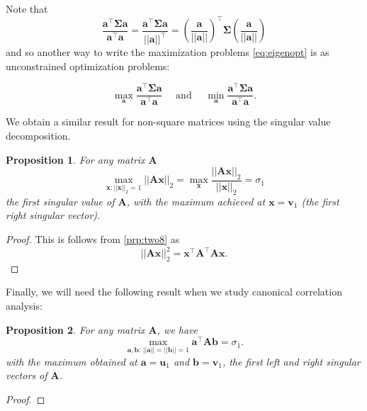 \documentclass[]{book}
\newtheorem{proposition}{Proposition}[chapter]
\theoremstyle{definition}
\theoremstyle{definition}
\theoremstyle{definition}
\theoremstyle{remark}
\begin{document}
Note that \[\frac{\boldsymbol a^\top \boldsymbol \Sigma\boldsymbol a}{\boldsymbol a^\top\boldsymbol a}=\frac{\boldsymbol a^\top \boldsymbol \Sigma\boldsymbol a}{||\boldsymbol a||^\top} = (\frac{\boldsymbol a}{||\boldsymbol a||})^\top \boldsymbol \Sigma(\frac{\boldsymbol a}{||\boldsymbol a||})\]
and so another way to write the maximization problems \eqref{eq:eigenopt} is as unconstrained optimization problems:

\[\max_{\boldsymbol a}\frac{\boldsymbol a^\top \boldsymbol \Sigma\boldsymbol a}{\boldsymbol a^\top\boldsymbol a}\quad \mbox{ and } \quad \min_{\boldsymbol a}\frac{\boldsymbol a^\top \boldsymbol \Sigma\boldsymbol a}{\boldsymbol a^\top\boldsymbol a}.\]

We obtain a similar result for non-square matrices using the singular value decomposition.

\begin{proposition}
\protect\hypertarget{prp:svdmax1}{}{\label{prp:svdmax1} }For any matrix \(\boldsymbol A\)
\[\max_{\boldsymbol x: ||\boldsymbol x||_2=1}||\boldsymbol A\boldsymbol x||_2=\max_{\boldsymbol x}\frac{||\boldsymbol A\boldsymbol x||_2}{||\boldsymbol x||_2}=\sigma_1\]
the first singular value of \(\boldsymbol A\), with the maximum achieved at \(\boldsymbol x=\boldsymbol v_1\) (the first right singular vector).
\end{proposition}
\begin{proof}
{}This is follows from \ref{prp:two8} as
\[||\boldsymbol A\boldsymbol x||_2^2=\boldsymbol x^\top \boldsymbol A^\top\boldsymbol A\boldsymbol x.\]
\end{proof}

Finally, we will need the following result when we study canonical correlation analysis:

\begin{proposition}
\protect\hypertarget{prp:svdmax2}{}{\label{prp:svdmax2} }For any matrix \(\boldsymbol A\), we have
\[
\max_{\boldsymbol a, \boldsymbol b:\, \vert \vert \boldsymbol a\vert \vert=\vert \vert \boldsymbol b\vert \vert =1} \boldsymbol a^\top \boldsymbol A\boldsymbol b=\sigma_1.
\]
with the maximum obtained at \(\boldsymbol a=\boldsymbol u_1\) and \(\boldsymbol b=\boldsymbol v_1\), the first left and right singular vectors of \(\boldsymbol A\).
\end{proposition}

\begin{proof}
{}
\end{proof}
\end{document}
